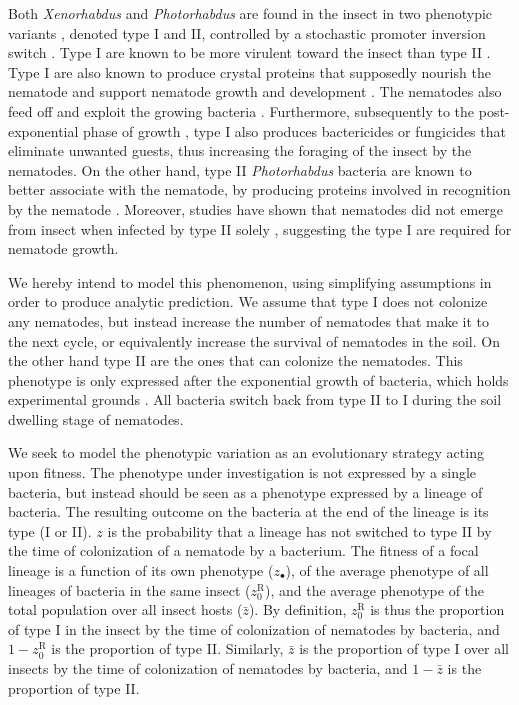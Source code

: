 \documentclass[10pt]{article}
\newcommand{\Xeno}{\textit{Xenorhabdus} }
\newcommand{\Photo}{\textit{Photorhabdus} }
\begin{document}
\begin{multicols}{2}
Both \Xeno and \Photo are found in the insect in two phenotypic variants \cite{Akhurst1982a,Forst1997}, denoted type I and II, controlled by a stochastic promoter inversion switch \cite{Somvanshi2012}.
Type I are known to be more virulent toward the insect than type II \cite{Volgyi,Givaudan2000}.
Type I are also known to produce crystal proteins \cite{Ciche2006,bintrim1998insertional} that supposedly nourish the nematode and support nematode growth and development \cite{Somvanshi2012}.
The nematodes also feed off and exploit the growing bacteria \cite{Waterfield2009}.
Furthermore, subsequently to the post-exponential phase of growth \cite{clarke1995virulence}, type I also produces bactericides \cite{Ji2004,Gualtieri2009} or fungicides that eliminate unwanted guests, thus increasing the foraging of the insect by the nematodes.
On the other hand, type II \Photo bacteria are known to better associate with the nematode, by producing proteins involved in recognition by the nematode \cite{Somvanshi2010,Heungens2002}.
Moreover, studies have shown that nematodes did not emerge from insect when infected by type II solely \cite{Sugar2012,Somvanshi2012}, suggesting the type I are required for nematode growth.

We hereby intend to model this phenomenon, using simplifying assumptions in order to produce analytic prediction. %
We assume that type I does not colonize any nematodes, but instead increase the number of nematodes that make it to the next cycle, or equivalently increase the survival of nematodes in the soil.
On the other hand type II are the ones that can colonize the nematodes.
This phenotype is only expressed after the exponential growth of bacteria, which holds experimental grounds \cite{Somvanshi2012}.
All bacteria switch back from type II to I during the soil dwelling stage of nematodes.

We seek to model the phenotypic variation as an evolutionary strategy acting upon fitness.
The phenotype under investigation is not expressed by a single bacteria, but instead should be seen as a phenotype expressed by a lineage of bacteria.
The resulting outcome on the bacteria at the end of the lineage is its type (I or II). $z$ is the probability that a lineage has not switched to type II by the time of colonization of a nematode by a bacterium.
The fitness of a focal lineage is a function of its own phenotype ($z_\bullet$), of the average phenotype of all lineages of bacteria in the same insect ($z_0^{\mathrm{R}}$), and the average phenotype of the total population over all insect hosts ($\bar{z}$).
By definition, $z_0^{\mathrm{R}}$ is thus the proportion of type I in the insect by the time of colonization of nematodes by bacteria, and $1-z_0^{\mathrm{R}}$ is the proportion of type II.
Similarly, $\bar{z}$ is the proportion of type I over all insects by the time of colonization of nematodes by bacteria, and $1-\bar{z}$ is the proportion of type II.


\end{multicols}
\end{document}
